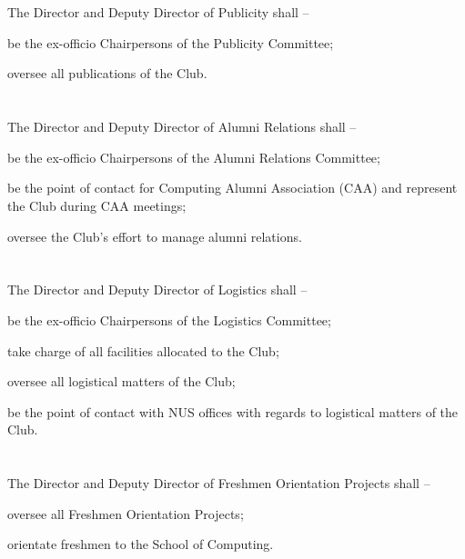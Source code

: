 \section{}
The Director and Deputy Director of Publicity shall –
	\begin{legal}
	\item be the ex-officio Chairpersons of the Publicity Committee;
	\item oversee all publications of the Club.
	\end{legal}

\section{}
The Director and Deputy Director of Alumni Relations shall –
	\begin{legal}
	\item be the ex-officio Chairpersons of the Alumni Relations Committee;
	\item be the point of contact for Computing Alumni Association (CAA) and represent the Club during CAA meetings;
	\item oversee the Club’s effort to manage alumni relations.
	\end{legal}

\section{}
The Director and Deputy Director of Logistics shall –
	\begin{legal}
	\item be the ex-officio Chairpersons of the Logistics Committee;
	\item take charge of all facilities allocated to the Club;
	\item oversee all logistical matters of the Club;
	\item be the point of contact with NUS offices with regards to logistical matters of the Club.
	\end{legal}

\section{}
The Director and Deputy Director of Freshmen Orientation Projects shall –
	\begin{legal}
	\item oversee all Freshmen Orientation Projects;
	\item orientate freshmen to the School of Computing.
	\end{legal}

